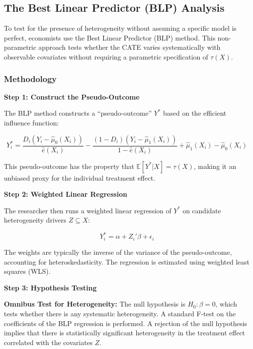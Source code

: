 \documentclass[12pt,a4paper]{article}
\begin{document}
\subsection{The Best Linear Predictor (BLP) Analysis}

To test for the presence of heterogeneity without assuming a specific model is perfect, economists use the Best Linear Predictor (BLP) method. This non-parametric approach tests whether the CATE varies systematically with observable covariates without requiring a parametric specification of $\tau(X)$.

\subsubsection{Methodology}

\textbf{Step 1: Construct the Pseudo-Outcome}

The BLP method constructs a ``pseudo-outcome'' $Y^*$ based on the efficient influence function:

\begin{equation}
Y^*_i = \frac{D_i(Y_i - \hat{\mu}_0(X_i))}{\hat{e}(X_i)} - \frac{(1-D_i)(Y_i - \hat{\mu}_1(X_i))}{1-\hat{e}(X_i)} + \hat{\mu}_1(X_i) - \hat{\mu}_0(X_i)
\end{equation}

This pseudo-outcome has the property that $\mathbb{E}[Y^* | X] = \tau(X)$, making it an unbiased proxy for the individual treatment effect.

\textbf{Step 2: Weighted Linear Regression}

The researcher then runs a weighted linear regression of $Y^*$ on candidate heterogeneity drivers $Z \subseteq X$:

\begin{equation}
Y^*_i = \alpha + Z_i' \beta + \epsilon_i
\end{equation}

The weights are typically the inverse of the variance of the pseudo-outcome, accounting for heteroskedasticity. The regression is estimated using weighted least squares (WLS).

\textbf{Step 3: Hypothesis Testing}

\textbf{Omnibus Test for Heterogeneity:} The null hypothesis is $H_0: \beta = 0$, which tests whether there is any systematic heterogeneity. A standard F-test on the coefficients of the BLP regression is performed. A rejection of the null hypothesis implies that there is statistically significant heterogeneity in the treatment effect correlated with the covariates $Z$.
\end{document}
